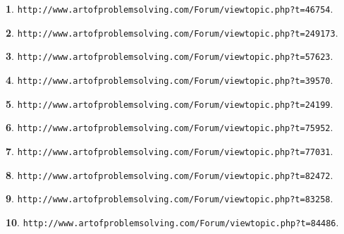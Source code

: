 \documentclass{article}
\theoremstyle{definition}
\newtheorem{s}{}
\begin{document}
\begin{s}
\texttt{http://www.artofproblemsolving.com/Forum/viewtopic.php?t=46754}.
\end{s}





\begin{s}
\texttt{http://www.artofproblemsolving.com/Forum/viewtopic.php?t=249173}.
\end{s}




\begin{s}
\texttt{http://www.artofproblemsolving.com/Forum/viewtopic.php?t=57623}.
\end{s}






\begin{s}
\texttt{http://www.artofproblemsolving.com/Forum/viewtopic.php?t=39570}.
\end{s}




\begin{s}
\texttt{http://www.artofproblemsolving.com/Forum/viewtopic.php?t=24199}.
\end{s}




\begin{s}
\texttt{http://www.artofproblemsolving.com/Forum/viewtopic.php?t=75952}.
\end{s}





\begin{s}
\texttt{http://www.artofproblemsolving.com/Forum/viewtopic.php?t=77031}.
\end{s}




\begin{s}
\texttt{http://www.artofproblemsolving.com/Forum/viewtopic.php?t=82472}.
\end{s}




\begin{s}
\texttt{http://www.artofproblemsolving.com/Forum/viewtopic.php?t=83258}.
\end{s}





\begin{s}
\texttt{http://www.artofproblemsolving.com/Forum/viewtopic.php?t=84486}.
\end{s}
\end{document}
